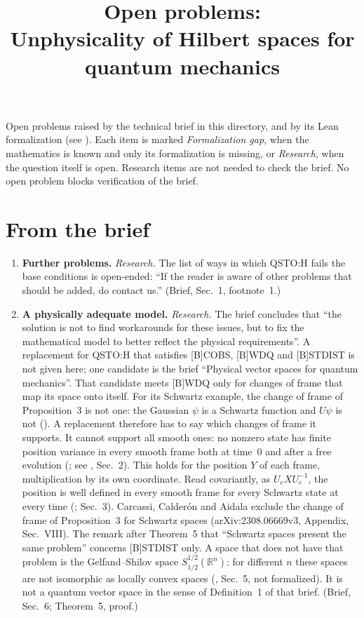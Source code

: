\documentclass[11pt]{article}
\title{Open problems:\\ Unphysicality of Hilbert spaces for quantum mechanics}
\author{}
\date{}
\begin{document}
\maketitle

\noindent
Open problems raised by the technical brief in this directory, and by its Lean formalization
(see ). Each item is marked \emph{Formalization gap}, when the mathematics is known and only its
formalization is missing, or \emph{Research}, when the question itself is open.
Research items are not needed to check the brief. No open problem blocks verification of the brief.

\section*{From the brief}
\begin{enumerate}
\item \textbf{Further problems.} \emph{Research.} The list of ways in which QSTO:H fails the
  base conditions is open-ended: ``If the reader is aware of other problems that should be
  added, do contact us.'' (Brief, Sec.~1, footnote~1.)
\item \textbf{A physically adequate model.} \emph{Research.} The brief concludes that ``the
  solution is not to find workarounds for these issues, but to fix the mathematical model to
  better reflect the physical requirements''. A replacement for QSTO:H that satisfies [B]COBS,
  [B]WDQ and [B]STDIST is not given here; one candidate is the brief ``Physical vector spaces
  for quantum mechanics''. That candidate meets [B]WDQ only for changes of frame that map its
  space onto itself. For its Schwartz example, the change of frame of Proposition~3 is not one:
  the Gaussian $\psi$ is a Schwartz function and $U\psi$ is not
  (). A replacement
  therefore has to say which changes of frame it supports. It cannot support all smooth ones:
  no nonzero state has finite position variance in every smooth frame both at time~0 and after a
  free evolution (; see , Sec.~2).
  This holds for the position $Y$ of each frame, multiplication by its own coordinate. Read
  covariantly, as $U_e X U_e^{-1}$, the position is well defined in every smooth frame for every
  Schwartz state at every time (; Sec.~3).
  Carcassi, Calder\'on and Aidala exclude the change of frame of Proposition~3 for Schwartz
  spaces (arXiv:2308.06669v3, Appendix, Sec.~VIII). The remark
  after Theorem~5 that ``Schwartz spaces present the same problem'' concerns [B]STDIST only.
  A space that does not have that problem is the Gelfand--Shilov space
  $S^{1/2}_{1/2}(\mathbb R^n)$: for different $n$ these spaces are not isomorphic as locally
  convex spaces (, Sec.~5, not formalized).
  It is not a quantum vector space in the sense of Definition~1 of that brief.
  (Brief, Sec.~6; Theorem~5, proof.)
\end{enumerate}
\end{document}
